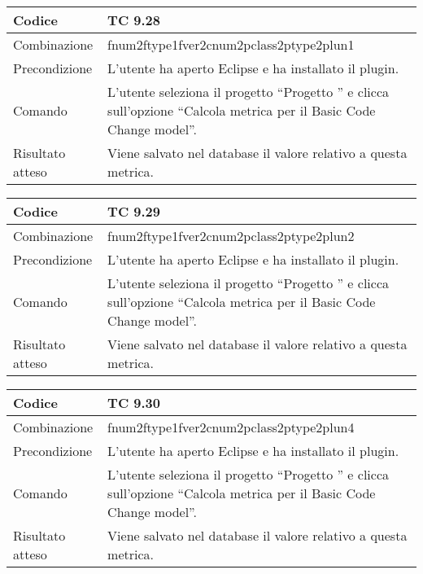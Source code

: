 \begin{table}[ht]
\begin{tabular}{|p{3cm}|p{9cm}|}
\hline
\cellcolor{lightgray}Codice				& TC 9.28								\\
\hline
\cellcolor{lightgray}Combinazione		& fnum2ftype1fver2cnum2pclass2ptype2plun1									\\
\hline
\cellcolor{lightgray}Precondizione		& L'utente ha aperto Eclipse e ha installato il plugin.		\\
\hline
\cellcolor{lightgray}Comando			& L'utente seleziona il progetto ``Progetto ''  e clicca sull'opzione ``Calcola metrica per il Basic Code Change model''.	\\
\hline
\cellcolor{lightgray}Risultato atteso	& Viene salvato nel database il valore relativo a questa metrica.\\
\hline
\end{tabular}
\end{table}

\begin{table}[ht]
\begin{tabular}{|p{3cm}|p{9cm}|}
\hline
\cellcolor{lightgray}Codice				& TC 9.29								\\
\hline
\cellcolor{lightgray}Combinazione		& fnum2ftype1fver2cnum2pclass2ptype2plun2									\\
\hline
\cellcolor{lightgray}Precondizione		& L'utente ha aperto Eclipse e ha installato il plugin.		\\
\hline
\cellcolor{lightgray}Comando			& L'utente seleziona il progetto ``Progetto ''  e clicca sull'opzione ``Calcola metrica per il Basic Code Change model''.	\\
\hline
\cellcolor{lightgray}Risultato atteso	& Viene salvato nel database il valore relativo a questa metrica.\\
\hline
\end{tabular}
\end{table}

\begin{table}[ht]
\begin{tabular}{|p{3cm}|p{9cm}|}
\hline
\cellcolor{lightgray}Codice				& TC 9.30								\\
\hline
\cellcolor{lightgray}Combinazione		& fnum2ftype1fver2cnum2pclass2ptype2plun4									\\
\hline
\cellcolor{lightgray}Precondizione		& L'utente ha aperto Eclipse e ha installato il plugin.		\\
\hline
\cellcolor{lightgray}Comando			& L'utente seleziona il progetto ``Progetto ''  e clicca sull'opzione ``Calcola metrica per il Basic Code Change model''.	\\
\hline
\cellcolor{lightgray}Risultato atteso	& Viene salvato nel database il valore relativo a questa metrica.\\
\hline
\end{tabular}
\end{table}

